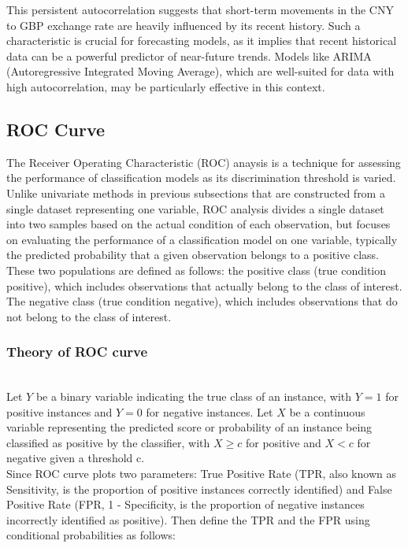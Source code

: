 \documentclass{article}\usepackage[]{graphicx}\usepackage[]{xcolor}
\numberwithin{equation}{section}
\begin{document}
\noindent
This persistent autocorrelation suggests that short-term movements in the CNY to GBP exchange rate are heavily influenced by its recent history. Such a characteristic is crucial for forecasting models, as it implies that recent historical data can be a powerful predictor of near-future trends. Models like ARIMA (Autoregressive Integrated Moving Average), which are well-suited for data with high autocorrelation, may be particularly effective in this context.

\subsection{ROC Curve}

The Receiver Operating Characteristic (ROC) anaysis is a technique for assessing the performance of classification models as its discrimination threshold is varied. Unlike univariate methods in previous subsections that are constructed from a single dataset representing one variable, ROC analysis divides a single dataset into two samples based on the actual condition of each observation, but focuses on evaluating the performance of a classification model on one variable, typically the predicted probability that a given observation belongs to a positive class. These two populations are defined as follows: the positive class (true condition positive), which includes observations that actually belong to the class of interest. The negative class (true condition negative), which includes observations that do not belong to the class of interest.\\

\noindent
\subsubsection{Theory of ROC curve}\\
Let $Y$ be a binary variable indicating the true class of an instance, with $Y = 1$ for positive instances and $Y = 0$ for negative instances. Let $X$ be a continuous variable representing the predicted score or probability of an instance being classified as positive by the classifier, with $X \geq c$ for positive and $X < c$ for negative given a threshold c.\\

\noindent
Since ROC curve plots two parameters\cite{rocAnalysis}: True Positive Rate (TPR, also known as Sensitivity, is the proportion of positive instances correctly identified) and False Positive Rate (FPR, 1 - Specificity, is the proportion of negative instances incorrectly identified as positive). Then define the TPR and the FPR using conditional probabilities as follows\cite{Pepe2003}:
\end{document}
